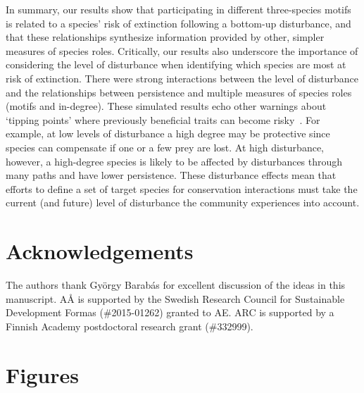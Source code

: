 \documentclass[12pt]{article}
\begin{document}
\begin{spacing}{2.0}
    In summary, our results show that participating in different three-species motifs is related to a species' risk of extinction following a bottom-up disturbance, and that these relationships synthesize information provided by other, simpler measures of species roles.
    Critically, our results also underscore the importance of considering the level of disturbance when identifying which species are most at risk of extinction.
    There were strong interactions between the level of disturbance and the relationships between persistence and multiple measures of species roles (motifs and in-degree).
    These simulated results echo other warnings about `tipping points' where previously beneficial traits can become risky~\citep{Latty2019,Golubski2016,Tylianakis2014}.
    For example, at low levels of disturbance a high degree may be protective since species can compensate if one or a few prey are lost. 
    At high disturbance, however, a high-degree species is likely to be affected by disturbances through many paths and have lower persistence.
    These disturbance effects mean that efforts to define a set of target species for conservation interactions must take the current (and future) level of disturbance the community experiences into account.
    
\section*{Acknowledgements}

    The authors thank Gy\"{o}rgy Barab\'{a}s for excellent discussion of the ideas in this manuscript. A{\AA} is supported by the Swedish Research Council for Sustainable Development Formas (\#2015-01262) granted to AE. ARC is supported by a Finnish Academy postdoctoral research grant (\#332999).

\clearpage    

\section*{Figures}
    


\end{spacing}
\end{document}
